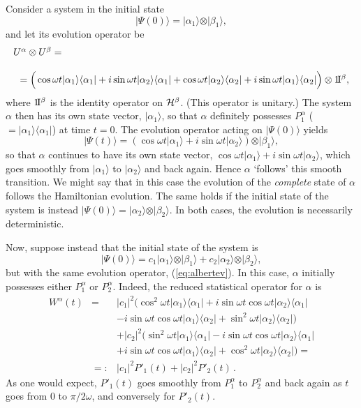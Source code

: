 \documentclass[12pt]{article}
\newcommand{\be}{\begin{equation}}
\newcommand{\ee}{\end{equation}}
\newcommand{\ident}{1\!{\rm I}}                                 %
\newcommand{\cH}{\cal{H}}                                       %
\newcommand{\ga}{\alpha}                                        %
\newcommand{\gb}{\beta}                                         %
\newcommand{\gw}{\omega}                                        %
\newcommand{\bra}[1]{\langle #1\vert}                           %
\newcommand{\ket}[1]{\vert #1\rangle}                           %
\begin{document}
Consider a system in the initial state
\be
\label{eq:albertsimple}
\ket{\Psi(0)} = \ket{\ga_1}\otimes\ket{\gb_1},
\ee
and let its evolution operator be
\be
  \label{eq:albertev}
  \begin{array}{l}
    U^{\ga} \otimes U^{\gb}= \\[3ex]
    \ \ = \Big( \cos \omega t \ket{\ga_1}\bra{\ga_1} +
    i\sin \omega t \ket{\ga_2}\bra{\ga_1} + \cos \omega t
    \ket{\ga_2}\bra{\ga_2} + i\sin \omega t \ket{\ga_1}\bra{\ga_2} \Big)
    \otimes \ident^{\gb},
  \end{array}
\ee
where $\ident^{\gb}$ is the identity operator on $\cH^{\gb}$.  (This 
operator is unitary.) The system $\ga$ then has its own state vector, 
$\ket{\ga_1}$, so that $\ga$ definitely possesses $P^{\ga}_1$ ($= 
\ket{\ga_1}\bra{\ga_1}$) at time $t = 0$.  The evolution operator 
acting on $\ket{\Psi(0)}$ yields
\be
  \label{eq:albertsimpletime}
  \ket{\Psi(t)} = \left(  \cos \gw t \ket{\ga_1} + i \sin \gw t
  \ket{\ga_2}\right)\otimes\ket{\gb_1},
\ee
so that $\ga$ continues to have its own state vector, $\cos \gw t
\ket{\ga_1} + i \sin \gw t \ket{\ga_2}$, which goes smoothly from
$\ket{\ga_1}$ to $\ket{\ga_2}$ and back again.  Hence $\ga$ `follows' 
this smooth transition.  We might say that in this case the evolution 
of the {\it complete} state of $\ga$ follows the Hamiltonian evolution.  
The same holds if the initial state of the system is instead 
$\ket{\Psi(0)} = \ket{\ga_2}\otimes\ket{\gb_2}$.  In both cases, the 
evolution is necessarily deterministic.

Now, suppose instead that the initial state of the system is
\be
  \label{eq:albertinitial}
  \ket{\Psi(0)} = c_1 \ket{\ga_1}\otimes\ket{\gb_1} +
  c_2 \ket{\ga_2}\otimes\ket{\gb_2},
\ee
but with the same evolution operator, (\ref{eq:albertev}).  In this 
case, $\ga$ initially possesses either $P^{\ga}_1$ or $P^{\ga}_2$.  
Indeed, the reduced statistical operator for $\ga$ is
\begin{eqnarray}
  W^{\ga}(t) & = & |c_1|^2 \Big( \cos^2 \gw t \ket{\ga_1}\bra{\ga_1}
  + i \sin\gw t \cos\gw t \ket{\ga_2}\bra{\ga_1} \nonumber  \\
             &   &
  - i \sin\gw t \cos\gw t \ket{\ga_1}\bra{\ga_2} +
  \sin^2 \gw t \ket{\ga_2}\bra{\ga_2} \Big) \nonumber   \\
             &   &
  + |c_2|^2 \Big( \sin^2 \gw t \ket{\ga_1}\bra{\ga_1} -
  i \sin\gw t \cos\gw t \ket{\ga_2}\bra{\ga_1} \nonumber   \\
             &   & 
  + i \sin\gw t \cos\gw t \ket{\ga_1}\bra{\ga_2} +
  \cos^2 \gw t \ket{\ga_2}\bra{\ga_2} \Big) = \nonumber  \\[1ex]
             & =:& |c_1|^2 {P'}_1(t) + |c_2|^2 {P'}_2(t)\,.
  \label{eq:albertreduced}
\end{eqnarray}
As one would expect, ${P'}_1(t)$ goes smoothly from $P^{\ga}_1$ to
$P^{\ga}_2$ and back again as $t$ goes from $0$ to $\pi/2\gw$, and
conversely for ${P'}_2(t)$.
\end{document}
